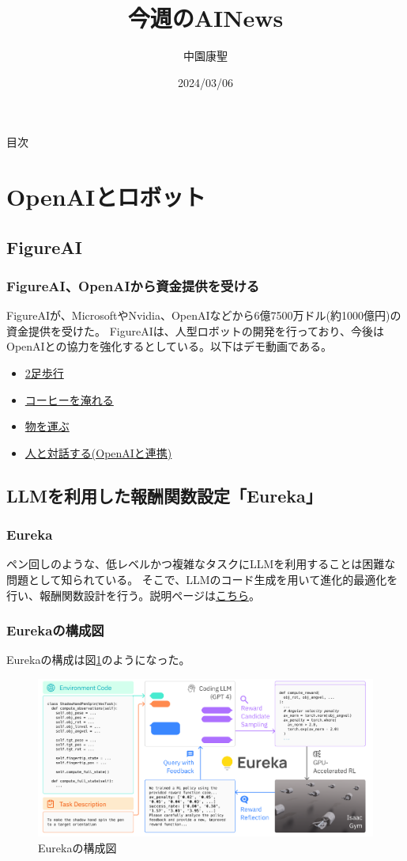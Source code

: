 \documentclass[dvipdfmx,12pt]{beamer}%
\title{今週のAINews}
\author{中園康聖}
\date{2024/03/06}
\begin{document}
\begin{frame}
\titlepage
\end{frame}
\begin{frame}{目次}
\tableofcontents
\end{frame}
\section{OpenAIとロボット}
\subsection{FigureAI}
\begin{frame}
\frametitle{FigureAI、OpenAIから資金提供を受ける}

FigureAIが、MicrosoftやNvidia、OpenAIなどから6億7500万ドル(約1000億円)の資金提供を受けた。
FigureAIは、人型ロボットの開発を行っており、今後はOpenAIとの協力を強化するとしている。以下はデモ動画である。
\begin{itemize}
\item \href{https://www.youtube.com/watch?v=-4erYt2t7Bs}{2足歩行}
\item \href{https://www.youtube.com/watch?v=Q5MKo7Idsok}{コーヒーを淹れる}
\item \href{https://www.youtube.com/watch?v=gEjXcEU3BbwURL}{物を運ぶ}
\item \href{https://www.youtube.com/watch?v=Sq1QZB5baNw}{人と対話する(OpenAIと連携)}
\end{itemize}
\end{frame}

\subsection{LLMを利用した報酬関数設定「Eureka」}
\begin{frame}
\frametitle{Eureka}
ペン回しのような、低レベルかつ複雑なタスクにLLMを利用することは困難な問題として知られている。
そこで、LLMのコード生成を用いて進化的最適化を行い、報酬関数設計を行う。説明ページは\href{https://eureka-research.github.io/}{こちら}。
\end{frame}

\begin{frame}
\frametitle{Eurekaの構成図}
Eurekaの構成は図\ref{fig:eureka}のようになった。

\begin{figure}[t]
\centering
\includegraphics[width=0.8\linewidth]{eureka.png}
\caption{Eurekaの構成図}
\label{fig:eureka}
\end{figure}
\end{frame}
\end{document}
